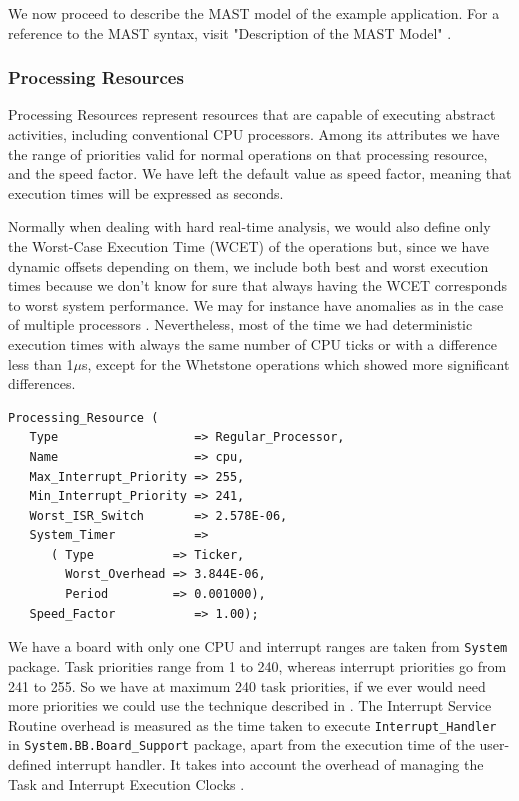 \documentclass{article}
\begin{document}
We now proceed to describe the MAST model of the example application. For a reference to the MAST syntax, visit "Description of the MAST Model" \cite{mast-description}.

\subsubsection{Processing Resources}

Processing Resources represent resources that are capable of executing abstract activities, including conventional CPU processors. Among its attributes we have the range of priorities valid for normal operations on that processing resource, and the speed factor. We have left the default value as speed factor, meaning that execution times will be expressed as seconds.

Normally when dealing with hard real-time analysis, we would also define only the Worst-Case Execution Time (WCET) of the operations but, since we have dynamic offsets depending on them, we include both best and worst execution times because we don't know for sure that always having the WCET corresponds to worst system performance. We may for instance have anomalies as in the case of multiple processors \cite{anomalies-multiprocessor}. Nevertheless, most of the time we had deterministic execution times with always the same number of CPU ticks or with a difference less than 1$\mu$s, except for the Whetstone operations which showed more significant differences.

\begin{lstlisting}
Processing_Resource (
   Type                   => Regular_Processor,
   Name                   => cpu,
   Max_Interrupt_Priority => 255,
   Min_Interrupt_Priority => 241,
   Worst_ISR_Switch       => 2.578E-06,
   System_Timer           =>
      ( Type           => Ticker,
        Worst_Overhead => 3.844E-06,
        Period         => 0.001000),
   Speed_Factor           => 1.00);
\end{lstlisting}

We have a board with only one CPU and interrupt ranges are taken from \texttt{System} package. Task priorities range from 1 to 240, whereas interrupt priorities go from 241 to 255. So we have at maximum 240 task priorities, if we ever would need more priorities we could use the technique described in \cite{limited-priorities}. The Interrupt Service Routine overhead is measured as the time taken to execute \texttt{Interrupt\_Handler} in \texttt{System.BB.Board\_Support} package, apart from the execution time of the user-defined interrupt handler. It takes into account the overhead of managing the Task and Interrupt Execution Clocks \cite{etc}.
\end{document}
